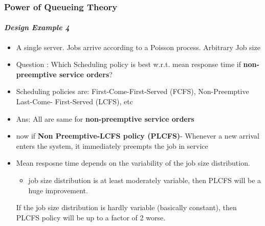 \documentclass{beamer}
\begin{document}
\begin{frame}
    \frametitle{Power of Queueing Theory}
    \framesubtitle{\textbf{\textit{Design Example 4}}}
	\begin{itemize}
		\item A single server. Jobs arrive according to a Poisson process. Arbitrary Job size
		\item Question : Which Scheduling policy is best w.r.t. mean response time if \textbf{non-					preemptive service orders}?
		\item Scheduling policies are: First-Come-First-Served (FCFS), Non-Preemptive Last-Come-						First-Served (LCFS), etc
		\item Ans: All are same for \textbf{non-preemptive service orders}
		\item now if \textbf{Non Preemptive-LCFS policy (PLCFS)}- Whenever a new arrival 								enters 	the system, it immediately preempts the job in service
		\item Mean resposne time depends on the variability of the job size distribution.
			\begin{itemize}
			 	\item job size distribution is at least moderately variable, then PLCFS will be a 								huge improvement.
			\end{itemize} If the job size distribution is hardly variable (basically constant), 								then PLCFS policy will be up to a factor of 2 worse.
	\end{itemize}	    
    
\end{frame}

    
\end{document}
